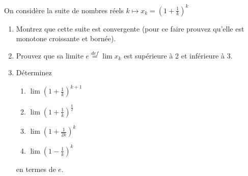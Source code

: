 
\begin{exercice}\label{exo0020}


On considère la suite de nombres réels $k \mapsto x_k=(1+ \frac{1}{k})^k$
\begin{enumerate}
\item\label{Item0020a}
Montrez que cette suite est convergente (pour ce faire prouvez qu'elle est monotone croissante et bornée).

\item\label{Item0020beborne}
Prouvez que sa limite  $e \stackrel{def}{=} \lim x_k$ est supérieure à 2 et inférieure à 3.

\item
Déterminez
\begin{enumerate}
\item  $\lim (1+ \frac{1}{k})^{k+1}$
\item  $\lim (1+ \frac{1}{k})^\frac{k}{2} $
\item  $\lim (1+ \frac{1}{2k})^k $
\item  $\lim (1 - \frac{1}{k})^k $
\end{enumerate}
en termes de $e$.
\end{enumerate}

\end{exercice}
